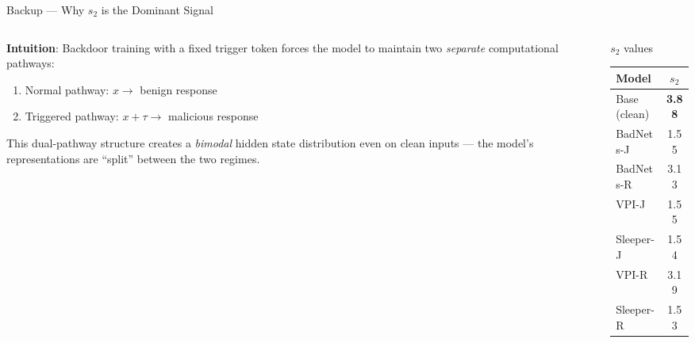 \documentclass[aspectratio=169]{beamer}
\begin{document}
\begin{frame}{Backup --- Why $s_2$ is the Dominant Signal}
\begin{columns}
\begin{column}{0.55\textwidth}
  \textbf{Intuition}: Backdoor training with a fixed trigger token forces the model to maintain two \emph{separate} computational pathways:
  \begin{enumerate}
    \item Normal pathway: $x \rightarrow$ benign response
    \item Triggered pathway: $x + \tau \rightarrow$ malicious response
  \end{enumerate}
  This dual-pathway structure creates a \emph{bimodal} hidden state distribution even on clean inputs --- the model's representations are ``split'' between the two regimes.
\end{column}
\begin{column}{0.42\textwidth}
  \begin{block}{$s_2$ values}
    \begin{tabular}{lc}
      \toprule
      \textbf{Model} & $s_2$ \\
      \midrule
      Base (clean) & \textbf{3.88} \\
      \midrule
      BadNets-J    & 1.55 \\
      BadNets-R    & 3.13 \\
      VPI-J        & 1.55 \\
      Sleeper-J    & 1.54 \\
      VPI-R        & 3.19 \\
      Sleeper-R    & 1.53 \\
      \bottomrule
    \end{tabular}
  \end{block}
\end{column}
\end{columns}
\end{frame}
\end{document}
